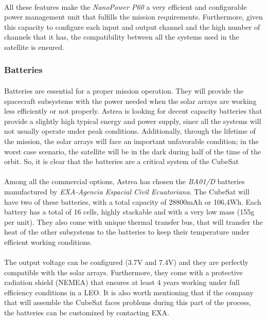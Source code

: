 \paragraph{}All these features make the \textit{NanoPower P60} a very efficient and configurable power management unit that fulfills the mission requirements. Furthermore, given this capacity to configure each input and output channel and the high number of channels that it has, the compatibility between all the systems used in the satellite is ensured.

\subsubsection{Batteries}

\paragraph{}	Batteries are essential for a proper mission operation. They will provide the spacecraft subsystems with the power needed when the solar arrays are working less efficiently or not properly. Astrea is looking for decent capacity batteries that provide a slightly high typical energy and power supply, since all the systems will not usually operate under peak conditions. Additionally, through the lifetime of the mission, the solar arrays will face an important unfavorable condition; in the worst case scenario, the satellite will be in the dark during half of the time of the orbit. So, it is clear that the batteries are a critical system of the CubeSat

\paragraph{}Among all the commercial options, Astrea has chosen the \textit{BA01/D} batteries manufactured by \textit{EXA-Agencia Espacial Civil Ecuatoriana}. The CubeSat will have two of these batteries, with a total capacity of 28800mAh or 106,4Wh. Each battery has a total of 16 cells, highly stackable and with a very low mass (155g per unit). They also come with unique thermal transfer bus, that will transfer the heat of the other subsystems to the batteries to keep their temperature under efficient working conditions.

\paragraph{}The output voltage can be configured (3.7V and 7.4V) and they are perfectly compatible with the solar arrays. Furthermore, they come with a protective radiation shield (NEMEA) that ensures at least 4 years working under full efficiency conditions in a LEO. It is also worth mentioning that if the company that will assemble the CubeSat faces problems during this part of the process, the batteries can be customized by contacting EXA.


